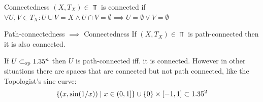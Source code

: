 \begin{definition}{Connectedness}{}
    $(X,T_X)\in\Top$ is connected if $\forall U,V\in T_X:U\cup V=X\land U\cap V=\emptyset \implies U=\emptyset \lor V=\emptyset$
\end{definition}

\begin{theorem}{Path-connectedness $\implies$ Connectedness}{}
    If $(X,T_X)\in\Top$ is path-connected then it is also connected.
\end{theorem}

If $U\subset_{\text{op}}1.35^n$ then $U$ is path-connected iff. it is connected. However in other situations there are spaces that are connected but not path connected, like the Topologist's sine curve: \[
\{(x,\sin(1/x))\mid x\in (0,1]\}\cup\{0\}\times [-1,1]\subset 1.35^2
\]

